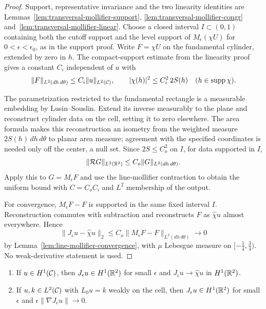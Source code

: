 \begin{proof}
\leanok
Support, representative invariance and the two linearity identities are
Lemmas~\ref{lem:transversal-mollifier-support},
\ref{lem:transversal-mollifier-congr} and~\ref{lem:transversal-mollifier-linear}.
Choose a closed interval $I\subset(0,1)$ containing both the cutoff support
and the level support of $M_\epsilon(\chi U)$ for $0<\epsilon<\epsilon_0$,
as in the support proof. Write $F=\chi U$ on the fundamental cylinder,
extended by zero in $h$. The compact-support estimate from the linearity
proof gives a constant $C_i$ independent of $u$ with
\[
  \|F\|_{L^2(dh\,d\theta)}\le C_i\|u\|_{L^2(\mathcal{C})},
  \qquad |\chi(h)|^2\le C_i^2\,2S(h)\quad(h\in\operatorname{supp}\chi).
\]

The parametrization restricted to the fundamental rectangle is a measurable
embedding by Lusin--Souslin. Extend its inverse measurably to the plane and
reconstruct cylinder data on the cell, setting it to zero elsewhere. The
area formula makes this reconstruction an isometry from the weighted
measure $2S(h)\,dh\,d\theta$ to planar area measure; agreement with the
specified coordinates is needed only off the center, a null set. Since
$2S\le C_o^2$ on $I$, for data supported in $I$,
\[
  \|\mathcal R G\|_{L^2(\mathbb{R}^2)}\le C_o\|G\|_{L^2(dh\,d\theta)}.
\]
Apply this to $G=M_\epsilon F$ and use the line-mollifier contraction to
obtain the uniform bound with $C=C_oC_i$ and $L^2$ membership of the output.

For convergence, $M_\epsilon F-F$ is supported in the same fixed interval
$I$. Reconstruction commutes with subtraction and reconstructs $F$ as
$\hat\chi u$ almost everywhere. Hence
\[
  \|J_\epsilon u-\hat\chi u\|_2
    \le C_o\|M_\epsilon F-F\|_{L^2(dh\,d\theta)}\longrightarrow0
\]
by Lemma~\ref{lem:line-mollifier-convergence}, with $\mu$ Lebesgue measure
on $[-\frac14,\frac34)$. No weak-derivative statement is used.
\end{proof}

\begin{lemma}
\label{lem:transversal-mollifier-derivatives}
\leanok
\begin{enumerate}
  \item If $u\in H^1(\mathcal{C})$, then $J_\epsilon u\in H^1(\mathbb{R}^2)$ for small $\epsilon$ and
    $J_\epsilon u\to\hat\chi u$ in $H^1(\mathbb{R}^2)$.
  \item If $u,k\in L^2(\mathcal{C})$ with $L_0u=k$ weakly on the cell, then $J_\epsilon u\in H^1(\mathbb{R}^2)$
    for small $\epsilon$ and $\epsilon\|\nabla J_\epsilon u\|\to0$.
\end{enumerate}
\end{lemma}

